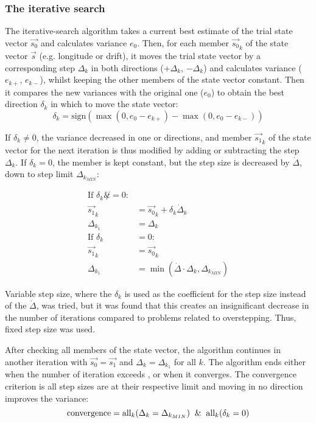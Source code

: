 \subsubsection{The iterative search}
The iterative-search algorithm takes a current best estimate of the trial state vector $\Vec{s_0}$ and calculates variance $e_0$. Then, for each member $\Vec{s_0}_k$ of the state vector $\Vec{s}$ (e.g. longitude or drift), it moves the trial state vector by a corresponding step $\Delta_k$ in both directions ($+\Delta_k$, $-\Delta_k$) and calculates variance ($e_{k+}$, $e_{k-}$), whilst keeping the other members of the state vector constant. Then it compares the new variances with the original one ($e_0$) to obtain the best direction $\delta_k$ in which to move the state vector:
\begin{equation*}
    \delta_k = \text{sign}(\max(0, e_0 - e_{k+}) - \max(0, e_0 - e_{k-}))
\end{equation*}

If $\delta_k \not = 0$, the variance decreased in one or directions, and member $\Vec{s_1}_k$ of the state vector for the next iteration is thus modified by adding or subtracting the step $\Delta_k$. If $\delta_k = 0$, the member is kept constant, but the step size is decreased by $\dot\Delta$, down to step limit $\Delta_{k_{MIN}}$:

\begin{align*}
    \text{If } \delta_k \not &= 0: \\
        \Vec{s_1}_k &= \Vec{s_0}_k + \delta_k \dot \Delta_k \\
        \Delta_{k_1} &= \Delta_{k} \\
    \text{If } \delta_k &= 0: \\
        \Vec{s_1}_k &= \Vec{s_0}_k \\
        \Delta_{k_1} &= \min(\dot\Delta \cdot \Delta_k, \Delta_{k_{MIN}})
\end{align*}

Variable step size, where the $\delta_k$ is used as the coefficient for the step size instead of the $\dot\Delta$, was tried, but it was found that this creates an insignificant decrease in the number of iterations compared to problems related to overstepping. Thus, fixed step size was used.

After checking all members of the state vector, the algorithm continues in another iteration with $\Vec{s_0} = \Vec{s_1}$ and  $\Delta_k = \Delta_{k_1}$ for all $k$. The algorithm ends either when the number of iteration exceeds , or when it converges. The convergence criterion is all step sizes are at their respective limit and moving in no direction improves the variance:
\begin{equation*}
    \text{convergence} = \text{all}_k(\Delta_k = \Delta_{k_{MIN}}) \And \text{all}_k(\delta_k = 0)
\end{equation*}

